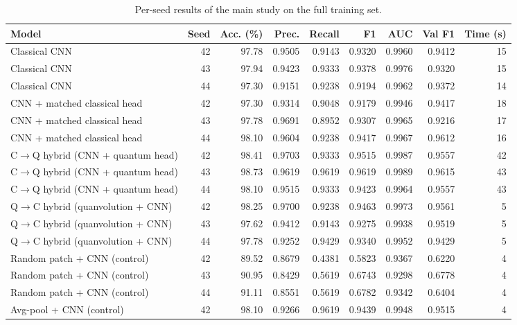 \begin{table}[htbp]
\centering
\scriptsize
\caption{Per-seed results of the main study on the full training set.}
\label{tab:app_study_runs}
\begin{adjustbox}{max width=\linewidth}
\begin{tabular}{lrrrrrrrr}
\toprule
Model & Seed & Acc. (\%) & Prec. & Recall & F1 & AUC & Val F1 & Time (s) \\
\midrule
Classical CNN & 42 & 97.78 & 0.9505 & 0.9143 & 0.9320 & 0.9960 & 0.9412 & 15 \\
Classical CNN & 43 & 97.94 & 0.9423 & 0.9333 & 0.9378 & 0.9976 & 0.9320 & 15 \\
Classical CNN & 44 & 97.30 & 0.9151 & 0.9238 & 0.9194 & 0.9962 & 0.9372 & 14 \\
CNN + matched classical head & 42 & 97.30 & 0.9314 & 0.9048 & 0.9179 & 0.9946 & 0.9417 & 18 \\
CNN + matched classical head & 43 & 97.78 & 0.9691 & 0.8952 & 0.9307 & 0.9965 & 0.9216 & 17 \\
CNN + matched classical head & 44 & 98.10 & 0.9604 & 0.9238 & 0.9417 & 0.9967 & 0.9612 & 16 \\
C$\rightarrow$Q hybrid (CNN + quantum head) & 42 & 98.41 & 0.9703 & 0.9333 & 0.9515 & 0.9987 & 0.9557 & 42 \\
C$\rightarrow$Q hybrid (CNN + quantum head) & 43 & 98.73 & 0.9619 & 0.9619 & 0.9619 & 0.9989 & 0.9615 & 43 \\
C$\rightarrow$Q hybrid (CNN + quantum head) & 44 & 98.10 & 0.9515 & 0.9333 & 0.9423 & 0.9964 & 0.9557 & 43 \\
Q$\rightarrow$C hybrid (quanvolution + CNN) & 42 & 98.25 & 0.9700 & 0.9238 & 0.9463 & 0.9973 & 0.9561 & 5 \\
Q$\rightarrow$C hybrid (quanvolution + CNN) & 43 & 97.62 & 0.9412 & 0.9143 & 0.9275 & 0.9938 & 0.9519 & 5 \\
Q$\rightarrow$C hybrid (quanvolution + CNN) & 44 & 97.78 & 0.9252 & 0.9429 & 0.9340 & 0.9952 & 0.9429 & 5 \\
Random patch + CNN (control) & 42 & 89.52 & 0.8679 & 0.4381 & 0.5823 & 0.9367 & 0.6220 & 4 \\
Random patch + CNN (control) & 43 & 90.95 & 0.8429 & 0.5619 & 0.6743 & 0.9298 & 0.6778 & 4 \\
Random patch + CNN (control) & 44 & 91.11 & 0.8551 & 0.5619 & 0.6782 & 0.9342 & 0.6404 & 4 \\
Avg-pool + CNN (control) & 42 & 98.10 & 0.9266 & 0.9619 & 0.9439 & 0.9948 & 0.9515 & 4 \\

\end{tabular}
\end{adjustbox}
\end{table}
